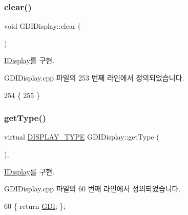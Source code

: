 \subsubsection{\texorpdfstring{clear()}{clear()}}
{\footnotesize\ttfamily void G\+D\+I\+Display\+::clear (\begin{DoxyParamCaption}{ }\end{DoxyParamCaption})\hspace{0.3cm}{\ttfamily [virtual]}}



\mbox{\hyperlink{class_i_display_affb8a8b5651d138058cdbd088ff3968d}{I\+Display}}를 구현.



G\+D\+I\+Display.\+cpp 파일의 253 번째 라인에서 정의되었습니다.


\begin{DoxyCode}
254 \{
255 \}
\end{DoxyCode}
\mbox{\label{class_g_d_i_display_a4c7acf65b39361a2a1479c71f6f404a7}} 
\subsubsection{\texorpdfstring{get\+Type()}{getType()}}
{\footnotesize\ttfamily virtual \mbox{\hyperlink{_display_8h_aa50f63b0688d0250e0be64d8401d09a0}{D\+I\+S\+P\+L\+A\+Y\+\_\+\+T\+Y\+PE}} G\+D\+I\+Display\+::get\+Type (\begin{DoxyParamCaption}{ }\end{DoxyParamCaption})\hspace{0.3cm}{\ttfamily [inline]}, {\ttfamily [virtual]}}



\mbox{\hyperlink{class_i_display_a2c7fd4c6721dd8a6992b78f0c588f6f9}{I\+Display}}를 구현.



G\+D\+I\+Display.\+cpp 파일의 60 번째 라인에서 정의되었습니다.


\begin{DoxyCode}
60 \{ \textcolor{keywordflow}{return} \mbox{\hyperlink{_display_8h_aa50f63b0688d0250e0be64d8401d09a0ac22b78df6634245907697ac0ba4b87af}{GDI}}; \};
\end{DoxyCode}
\mbox{\label{class_g_d_i_display_a7d3e0b3443b68302d759d7cdecd718ef}} 
